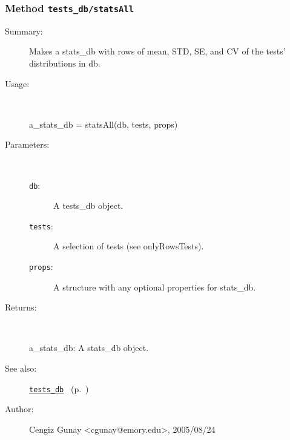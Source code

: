 \subsubsection[Method \texttt{statsAll}]{Method \texttt{tests\_db/statsAll}}%
%
\label{ref_tests_db__statsAll}%
\hypertarget{ref_tests_db__statsAll}{}%
\begin{description}
\item[Summary:]Makes a stats\_db with rows of mean, STD, SE, and CV of the tests' distributions in db.
%
\item[Usage:]~%
\begin{lyxcode}%
a\_stats\_db = statsAll(db, tests, props)
%
\end{lyxcode}%
%
%
\item[Parameters:]~
\begin{description}%
\item[\texttt{db}:]
 A tests\_db object.
\item[\texttt{tests}:]
 A selection of tests (see onlyRowsTests).
\item[\texttt{props}:]
 A structure with any optional properties for stats\_db.
\end{description}%
%
\item[Returns:]~

	a\_stats\_db: A stats\_db object.
%
%
\item[See also:]%
\hyperlink{ref_tests_db}{\texttt{tests\_db}}%
\ (p.~\pageref{ref_tests_db})%
%
%
\item[Author:]%
Cengiz Gunay <cgunay@emory.edu>, 2005/08/24%
\end{description}
\methodline%

